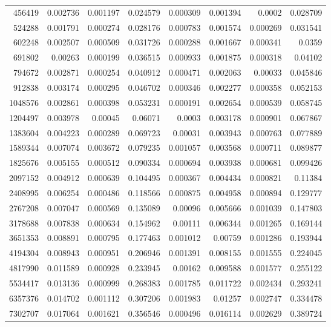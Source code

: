 \begin{longtable}{r r r r r r r r}
456419 & 0.002736 & 0.001197 & 0.024579 & 0.000309 & 0.001394 & 0.0002 & 0.028709 \\
524288 & 0.001791 & 0.000274 & 0.028176 & 0.000783 & 0.001574 & 0.000269 & 0.031541 \\
602248 & 0.002507 & 0.000509 & 0.031726 & 0.000288 & 0.001667 & 0.000341 & 0.0359 \\
691802 & 0.00263 & 0.000199 & 0.036515 & 0.000933 & 0.001875 & 0.000318 & 0.04102 \\
794672 & 0.002871 & 0.000254 & 0.040912 & 0.000471 & 0.002063 & 0.00033 & 0.045846 \\
912838 & 0.003174 & 0.000295 & 0.046702 & 0.000346 & 0.002277 & 0.000358 & 0.052153 \\
1048576 & 0.002861 & 0.000398 & 0.053231 & 0.000191 & 0.002654 & 0.000539 & 0.058745 \\
1204497 & 0.003978 & 0.00045 & 0.06071 & 0.0003 & 0.003178 & 0.000901 & 0.067867 \\
1383604 & 0.004223 & 0.000289 & 0.069723 & 0.00031 & 0.003943 & 0.000763 & 0.077889 \\
1589344 & 0.007074 & 0.003672 & 0.079235 & 0.001057 & 0.003568 & 0.000711 & 0.089877 \\
1825676 & 0.005155 & 0.000512 & 0.090334 & 0.000694 & 0.003938 & 0.000681 & 0.099426 \\
2097152 & 0.004912 & 0.000639 & 0.104495 & 0.000367 & 0.004434 & 0.000821 & 0.11384 \\
2408995 & 0.006254 & 0.000486 & 0.118566 & 0.000875 & 0.004958 & 0.000894 & 0.129777 \\
2767208 & 0.007047 & 0.000569 & 0.135089 & 0.00096 & 0.005666 & 0.001039 & 0.147803 \\
3178688 & 0.007838 & 0.000634 & 0.154962 & 0.00111 & 0.006344 & 0.001265 & 0.169144 \\
3651353 & 0.008891 & 0.000795 & 0.177463 & 0.001012 & 0.00759 & 0.001286 & 0.193944 \\
4194304 & 0.008943 & 0.000951 & 0.206946 & 0.001391 & 0.008155 & 0.001555 & 0.224045 \\
4817990 & 0.011589 & 0.000928 & 0.233945 & 0.00162 & 0.009588 & 0.001577 & 0.255122 \\
5534417 & 0.013136 & 0.000999 & 0.268383 & 0.001785 & 0.011722 & 0.002434 & 0.293241 \\
6357376 & 0.014702 & 0.001112 & 0.307206 & 0.001983 & 0.01257 & 0.002747 & 0.334478 \\
7302707 & 0.017064 & 0.001621 & 0.356546 & 0.000496 & 0.016114 & 0.002629 & 0.389724 \\

\end{longtable}
